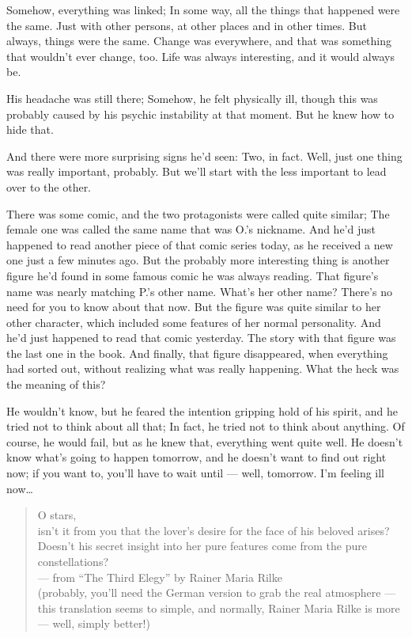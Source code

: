Somehow, everything was linked; In some way, all the things that happened were the same. 
Just with other persons, at other places and in other times. 
But always, things were the same. 
Change was everywhere, and that was something that wouldn't ever change, too. 
Life was always interesting, and it would always be. 

His headache was still there; Somehow, he felt physically ill, though this was probably caused by his psychic instability at that moment. 
But he knew how to hide that. 

And there were more surprising signs he'd seen: Two, in fact. 
Well, just one thing was really important, probably. 
But we'll start with the less important to lead over to the other.

There was some comic, and the two protagonists were called quite similar; The female one was called the same name that was O.'s nickname. 
And he'd just happened to read another piece of that comic series today, as he received a new one just a few minutes ago. 
But the probably more interesting thing is another figure he'd found in some famous comic he was always reading. 
That figure's name was nearly matching P.'s other name. 
What's her other name? There's no need for you to know about that now. 
But the figure was quite similar to her other character, which included some features of her normal personality. 
And he'd just happened to read that comic yesterday.
The story with that figure was the last one in the book. 
And finally, that figure disappeared, when everything had sorted out, without realizing what was really happening. 
What the heck was the meaning of this?

He wouldn't know, but he feared the intention gripping hold of his spirit, and he tried not to think about all that; In fact, he tried not to think about anything. 
Of course, he would fail, but as he knew that, everything went quite well.
He doesn't know what's going to happen tomorrow, and he doesn't want to find out right now; if you want to, you'll have to wait until --- well, tomorrow. 
I'm feeling ill now\ldots

\begin{quote}
O stars,\\
isn't it from you that the lover's desire for the face of his beloved arises? Doesn't 
his secret insight into her pure features come from the pure constellations?\\
--- from \enquote{The Third Elegy} by Rainer Maria Rilke\\
(probably, you'll need the German version to grab the real atmosphere --- this translation seems to simple, and normally, Rainer Maria Rilke is more --- well, simply better!)
\end{quote}

